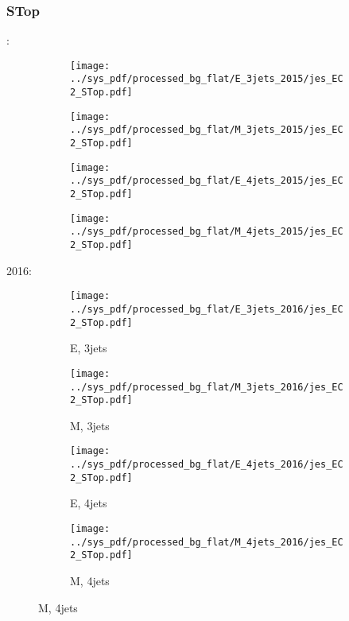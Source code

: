 \documentclass{beamer}
\begin{document}
\begin{frame}
\frametitle{STop}
\fontsize{5}{1}:
\begin{figure}
\centering
\begin{subfigure}[b]{0.24\textwidth}
\texttt{[image: ../sys\_pdf/processed\_bg\_flat/E\_3jets\_2015/jes\_EC2\_STop.pdf]}
\end{subfigure}
\begin{subfigure}[b]{0.24\textwidth}
\texttt{[image: ../sys\_pdf/processed\_bg\_flat/M\_3jets\_2015/jes\_EC2\_STop.pdf]}
\end{subfigure}
\begin{subfigure}[b]{0.24\textwidth}
\texttt{[image: ../sys\_pdf/processed\_bg\_flat/E\_4jets\_2015/jes\_EC2\_STop.pdf]}
\end{subfigure}
\begin{subfigure}[b]{0.24\textwidth}
\texttt{[image: ../sys\_pdf/processed\_bg\_flat/M\_4jets\_2015/jes\_EC2\_STop.pdf]}
\end{subfigure}
\end{figure}
2016:
\begin{figure}
\centering
\begin{subfigure}[b]{0.24\textwidth}
\texttt{[image: ../sys\_pdf/processed\_bg\_flat/E\_3jets\_2016/jes\_EC2\_STop.pdf]}
\captionsetup{font=tiny}
\caption{E, 3jets}
\end{subfigure}
\begin{subfigure}[b]{0.24\textwidth}
\texttt{[image: ../sys\_pdf/processed\_bg\_flat/M\_3jets\_2016/jes\_EC2\_STop.pdf]}
\captionsetup{font=tiny}
\caption{M, 3jets}
\end{subfigure}
\begin{subfigure}[b]{0.24\textwidth}
\texttt{[image: ../sys\_pdf/processed\_bg\_flat/E\_4jets\_2016/jes\_EC2\_STop.pdf]}
\captionsetup{font=tiny}
\caption{E, 4jets}
\end{subfigure}
\begin{subfigure}[b]{0.24\textwidth}
\texttt{[image: ../sys\_pdf/processed\_bg\_flat/M\_4jets\_2016/jes\_EC2\_STop.pdf]}
\captionsetup{font=tiny}
\caption{M, 4jets}
\end{subfigure}
\end{figure}
\end{frame}
\end{document}
